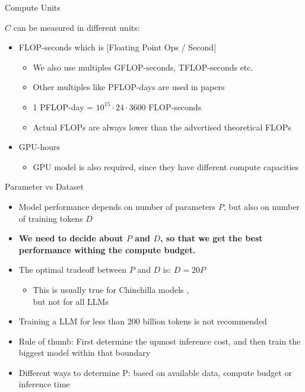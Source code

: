 \begin{vbframe}{Compute Units}

\vfill

$C$  can be measured in different units:\newline

\begin{itemize}
     \item FLOP-seconds which is [Floating Point Ops / Second] 
 	\begin{itemize}
 	    \item We also use multiples GFLOP-seconds, TFLOP-seconds etc.
 		\item Other multiples like PFLOP-days are used in papers
 		\item 1 PFLOP-day = $10^{15} \cdot 24 \cdot 3600$ FLOP-seconds
            \item Actual FLOPs are always lower than the advertised theoretical FLOPs
 	\end{itemize}
 	\item GPU-hours
 	\begin{itemize}
 	    \item GPU model is also required, since they have different compute capacities
 	\end{itemize}
 \end{itemize}

 \vfill

\end{vbframe}


\begin{vbframe}{Parameter vs Dataset}

\vfill

\begin{itemize}
    \item Model performance depends on number of parameters $P$, but also on number of training tokens $D$
	\item \textbf{We need to decide about $P$ and $D$, so that we get the best performance withing the compute budget.}
	\item The optimal tradeoff between $P$ and $D$ is: $D = 20 P$
	\begin{itemize}
	    \item This is usually true for Chinchilla models ,\\but not for all LLMs
	\end{itemize}
	\item Training a LLM for less than 200 billion tokens is not recommended
	\item Rule of thumb: First determine the upmost inference cost, and then train the biggest model within that boundary
    \item Different ways to determine P: based on available data, compute budget or inference time 
\end{itemize}

\vfill

\end{vbframe}

